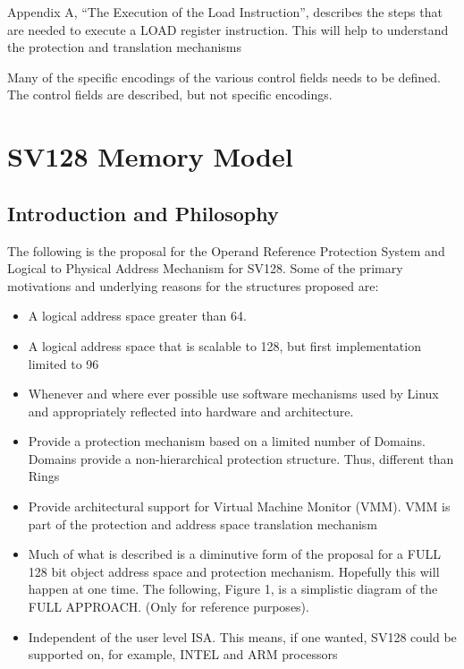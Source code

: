 \documentclass{article}
\begin{document}
Appendix A,  “The Execution of the Load Instruction”, describes the steps that are needed to execute a LOAD register instruction.  This will help to understand the protection and translation mechanisms

Many of the specific encodings of the various control fields needs to be defined.  The control fields are  described,  but not specific encodings.


\pagebreak



\clearpage
\section{SV128 Memory Model}
\label{sec:SV128MemoryModel}


\subsection{Introduction and Philosophy}

The following is the proposal for the Operand Reference Protection System and Logical to Physical Address Mechanism for SV128.  Some of the primary motivations and underlying reasons for the structures proposed are:


\begin{itemize}
\item A logical address space greater than 64. 
\item A logical address space that is scalable to 128,  but first implementation limited to 96
\item  Whenever and where ever possible use software mechanisms used by Linux and appropriately reflected into hardware and architecture.
\item  Provide a protection mechanism based on a limited number of Domains.  Domains provide a non-hierarchical protection structure. Thus, different than Rings
\item  Provide architectural support for Virtual Machine Monitor (VMM).  VMM is part of the protection and address space translation mechanism
\item  Much of what is described is a diminutive form of the proposal for a FULL 128 bit object address space and protection mechanism.  Hopefully this will happen at one time.   The following, Figure 1, is a  simplistic diagram of the FULL APPROACH. (Only for reference purposes).
\item  Independent of the user level ISA.  This means, if one wanted,  SV128 could be supported on, for example, INTEL and ARM processors
\end{itemize}
\end{document}
